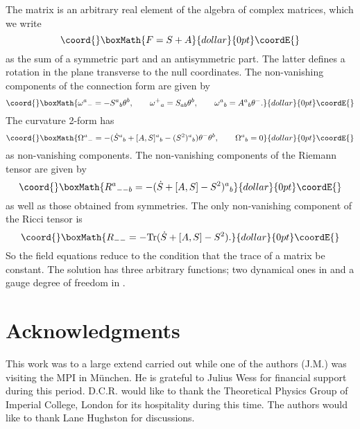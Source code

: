 \documentclass[12pt,a4paper]{article}
\newcounter{eg}
\def\tr{\mbox{Tr}}
\providecommand{\initiate}{\setcounter{equation}{0}}
\begin{document}
The matrix \coordHE{} is an arbitrary real element of the
algebra \coordHE{} of complex \coordHE{} matrices, which we write
$$\coord{}\boxMath{
F = S + A
}{dollar}{0pt}\coordE{}$$
as the sum of a symmetric part and an antisymmetric part.  The
latter defines a rotation in the plane transverse to the null
coordinates.  The non-vanishing components of the connection form are
given by
$$\coord{}\boxMath{
\omega^a{}_- = -S^a{}_b \theta^b,  \qquad
\omega^+{}_a = S_{ab} \theta^b,  \qquad
\omega^a{}_b = A^a{}_b \theta^-.
}{dollar}{0pt}\coordE{}$$
The curvature 2-form has 
$$\coord{}\boxMath{
\Omega^a{}_- = - (\dot S^a{}_b + [A, S]^a{}_b - (S^2)^a{}_b)  
\theta^- \theta^b, \qquad \Omega^a{}_b = 0
}{dollar}{0pt}\coordE{}$$
as non-vanishing components. The non-vanishing components of the
Riemann tensor are given by
$$\coord{}\boxMath{
R^a{}_{--b} =  - (\dot S + [A, S] - S^2)^a{}_b
}{dollar}{0pt}\coordE{}$$
as well as those obtained from symmetries. The only non-vanishing
component of the Ricci tensor is
$$\coord{}\boxMath{
R_{--} = - \tr (\dot  S + [A, S] - S^2).
}{dollar}{0pt}\coordE{}$$
So the field equations reduce to the condition that the trace of
a matrix be constant.  The solution has three arbitrary functions; two
dynamical ones in \coordHE{} and a gauge degree of freedom in \coordHE{}.




\initiate
\section*{Acknowledgments} This work was to a large extend carried out
while one of the authors (J.M.) was visiting the MPI in M\"unchen. He
is grateful to Julius Wess for financial support during this period.
D.C.R. would like to thank the Theoretical Physics Group of Imperial
College, London for its hospitality during this time. The authors
would like to thank Lane Hughston for discussions.
\end{document}
